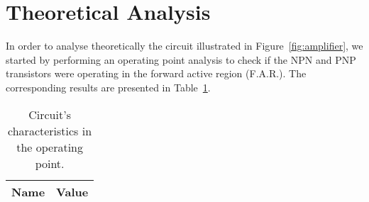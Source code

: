 \section{Theoretical Analysis}
\label{sec:analysis}

In order to analyse theoretically the circuit illustrated in Figure~\ref{fig:amplifier}, we started by performing an operating point analysis to check if the NPN and PNP transistors were operating in the forward active region (F.A.R.). The corresponding results are presented in Table~\ref{tab:op}. \\

\begin{table}[H]
  \centering
  \begin{tabular}{|l|r|}
    \hline    
    {\bf Name} & {\bf Value} \\ \hline
    
  \end{tabular}
  \caption{Circuit's characteristics in the operating point.}
  \label{tab:op}
\end{table}

